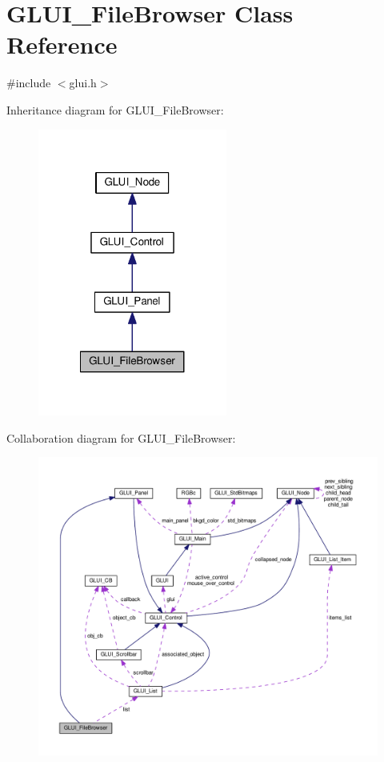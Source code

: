 \hypertarget{class_g_l_u_i___file_browser}{\section{G\+L\+U\+I\+\_\+\+File\+Browser Class Reference}
\label{class_g_l_u_i___file_browser}
}


{\ttfamily \#include $<$glui.\+h$>$}



Inheritance diagram for G\+L\+U\+I\+\_\+\+File\+Browser\+:\nopagebreak
\begin{figure}[H]
\begin{center}
\leavevmode
\includegraphics[width=176pt]{class_g_l_u_i___file_browser__inherit__graph}
\end{center}
\end{figure}


Collaboration diagram for G\+L\+U\+I\+\_\+\+File\+Browser\+:\nopagebreak
\begin{figure}[H]
\begin{center}
\leavevmode
\includegraphics[width=350pt]{class_g_l_u_i___file_browser__coll__graph}
\end{center}
\end{figure}
